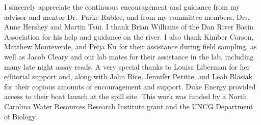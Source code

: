 \documentclass[ms, hidelinks]{uncgdissertationexp}
\theoremstyle{plain}
\theoremstyle{definition}
\theoremstyle{remark}
\begin{document}
\begin{acknowledgments}
\setlength{\parindent}{0.5in}
  I sincerely appreciate the continuous encouragement and guidance from my advisor and mentor Dr.~Parke Rublee, and from my committee members, Drs. Anne Hershey and Martin Tsui. I thank Brian Williams of the Dan River Basin Association for his help and guidance on the river. I also thank Kimber Corson, Matthew Monteverde, and Peija Ku for their assistance during field sampling, as well as Jacob Cleary and our lab mates for their assistance in the lab, including many late night assay reads. A very special thanks to Louisa Liberman for her editorial support and, along with John Rice, Jennifer Petitte, and Leah Blasiak for their copious amounts of encouragement and support. Duke Energy provided access to their boat launch at the spill site. This work was funded by a North Carolina Water Resources Research Institute grant and the UNCG Department of Biology.
\end{acknowledgments}


\tableofcontents


  \listoftables
  
\end{document}
